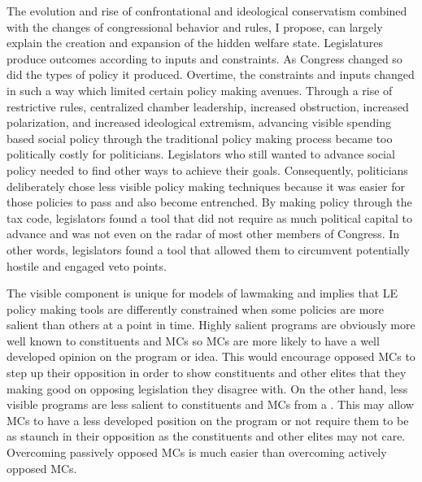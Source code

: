 \documentclass[12pt]{article}
\begin{document}
The evolution and rise of confrontational and ideological conservatism combined with the changes of congressional behavior and rules, I propose, can largely explain the creation and expansion of the hidden welfare state.  Legislatures produce outcomes according to inputs and constraints. As Congress changed so did the types of policy it produced. Overtime, the constraints and inputs changed in such a way which limited certain policy making avenues. Through a rise of restrictive rules, centralized chamber leadership, increased obstruction, increased polarization, and increased ideological extremism, advancing visible spending based social policy through the traditional policy making process became too politically costly for politicians. Legislators who still wanted to advance social policy needed to find other ways to achieve their goals. Consequently, politicians deliberately chose less visible policy making techniques because it was easier for those policies to pass and also become entrenched. By making policy through the tax code, legislators found a tool that did not require as much political capital to advance and was not even on the radar of most other members of Congress. In other words, legislators found a tool that allowed them to circumvent potentially hostile and engaged veto points. 


The visible component is unique for models of lawmaking and implies that LE policy making tools are differently constrained when some policies are more salient than others at a point in time. Highly salient programs are obviously more well known to constituents and MCs so MCs are more likely to have a well developed opinion on the program or idea. This would encourage opposed MCs to step up their opposition in order to show constituents and other elites that they making good on opposing legislation they disagree with. On the other hand, less visible programs are less salient to constituents and MCs from a . This may allow MCs to have a less developed position on the program or not require them to be as staunch in their opposition as the constituents and other elites may not care. Overcoming passively opposed MCs is much easier than overcoming actively opposed MCs.
\end{document}
